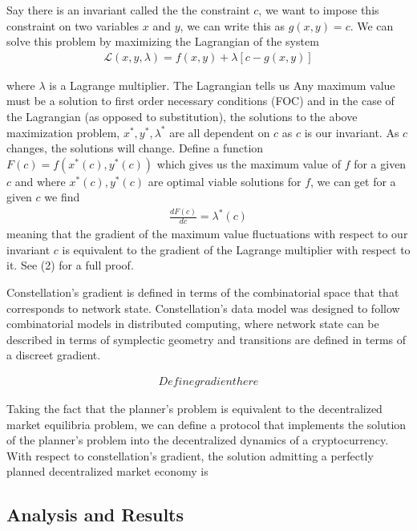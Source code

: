 \documentclass{article}
\begin{document}
Say there is an invariant called the the constraint $c$, we want to impose this constraint on two variables $x$ and $y$, we can write this as $g(x, y) = c$. We can solve this problem by maximizing the Lagrangian of the system
\begin{equation} \label{eq1}
\begin{split}
\mathcal{L}(x, y, \lambda) = f(x, y) + \lambda [c - g(x,y)]
\end{split}
\end{equation}

where $\lambda$ is a Lagrange multiplier. The Lagrangian tells us Any maximum value must be a solution to first order necessary conditions (FOC) and in the case of the Lagrangian (as opposed to substitution), the solutions to the above maximization problem, $x^*, y^*, \lambda^*$ are all dependent on $c$ as $c$ is our invariant. As $c$ changes, the solutions will change. Define a function $F(c) = f(x^*(c), y^*(c))$ which gives us the maximum value of $f$ for a given $c$ and where $x^*(c), y^*(c)$ are optimal viable solutions for $f$, we can get for a given $c$ we find
\begin{equation} \label{eq1}
\begin{split}
\frac{dF(c)}{dc} = \lambda^*(c) 
\end{split}
\end{equation}
meaning that the gradient of the maximum value fluctuations with respect to our invariant $c$ is equivalent to the gradient of the Lagrange multiplier with respect to it. See (2) for a full proof.

Constellation's gradient is defined in terms of the combinatorial space that that corresponds to network state. Constellation's data model was designed to follow combinatorial models in distributed computing, where network state can be described in terms of symplectic geometry and transitions are defined in terms of a discreet gradient.

\begin{equation} \label{eq1}
\begin{split}
Define gradient here
\end{split}
\end{equation}

Taking the fact that the planner's problem is equivalent to the decentralized market equilibria problem, we can define a protocol that implements the solution of the planner's problem into the decentralized dynamics of a cryptocurrency. With respect to constellation's gradient, the solution admitting a perfectly planned decentralized market economy is


\subsection{Analysis and Results}



\end{document}

